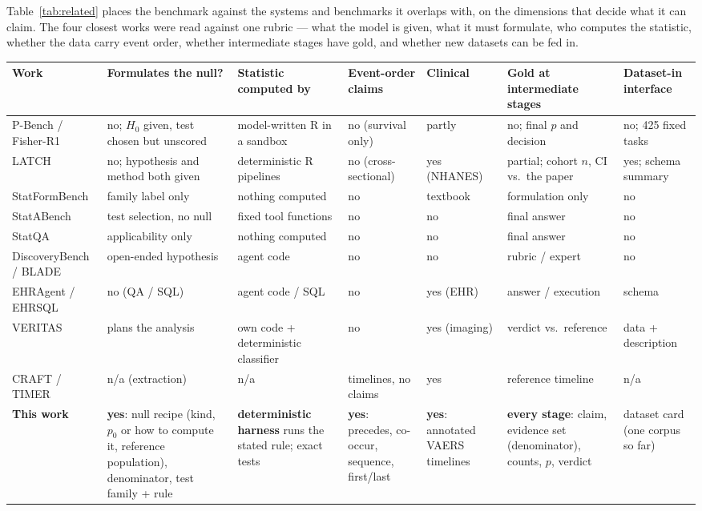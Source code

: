 Table~\ref{tab:related} places the benchmark against the systems and benchmarks
it overlaps with, on the dimensions that decide what it can claim. The four
closest works were read against one rubric --- what the model is given, what it
must formulate, who computes the statistic, whether the data carry event order,
whether intermediate stages have gold, and whether new datasets can be fed in.

\begin{table}[t]
\centering
\scriptsize
\setlength{\tabcolsep}{3pt}
\renewcommand{\arraystretch}{1.15}
\begin{tabularx}{\textwidth}{@{}p{2.55cm} Y Y Y Y Y Y@{}}
\toprule
Work & Formulates the null? & Statistic computed by & Event-order claims & Clinical & Gold at intermediate stages & Dataset-in interface \\
\midrule
P-Bench / Fisher-R1 \cite{miao2026fisher} & no; $H_0$ given, test chosen but unscored & model-written R in a sandbox & no (survival only) & partly & no; final $p$ and decision & no; 425 fixed tasks \\
LATCH \cite{gim2026latch} & no; hypothesis and method both given & deterministic R pipelines & no (cross-sectional) & yes (NHANES) & partial; cohort $n$, CI vs.\ the paper & yes; schema summary \\
StatFormBench \cite{wang2026statformbench} & family label only & nothing computed & no & textbook & formulation only & no \\
StatABench \cite{zhu2026statabench} & test selection, no null & fixed tool functions & no & no & final answer & no \\
StatQA \cite{zhu2024statqa} & applicability only & nothing computed & no & no & final answer & no \\
DiscoveryBench / BLADE \cite{majumder2025discoverybench,gu2024blade} & open-ended hypothesis & agent code & no & no & rubric / expert & no \\
EHRAgent / EHRSQL \cite{shi2024ehragent,lee2022ehrsql} & no (QA / SQL) & agent code / SQL & no & yes (EHR) & answer / execution & schema \\
VERITAS \cite{veritas2026} & plans the analysis & own code + deterministic classifier & no & yes (imaging) & verdict vs.\ reference & data + description \\
CRAFT / TIMER \cite{timer2025} & n/a (extraction) & n/a & timelines, no claims & yes & reference timeline & n/a \\
\midrule
\textbf{This work} & \textbf{yes}: null recipe (kind, $p_0$ or how to compute it, reference population), denominator, test family + rule & \textbf{deterministic harness} runs the stated rule; exact tests & \textbf{yes}: precedes, co-occur, sequence, first/last & \textbf{yes}: annotated VAERS timelines & \textbf{every stage}: claim, evidence set (denominator), counts, $p$, verdict & dataset card (one corpus so far) \\

\end{tabularx}
\end{table}
